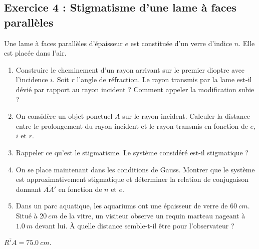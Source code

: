 \subsection{Exercice 4 : Stigmatisme d'une lame à faces parallèles}

Une lame à faces parallèles d'épaisseur $e$ est constituée d'un verre d'indice $n$. Elle est placée dans l'air. 

\begin{enumerate}
	\item Construire le cheminement d'un rayon arrivant sur le premier dioptre avec l'incidence $i$. Soit $r$ l'angle de réfraction. Le rayon transmis par la lame est-il dévié par rapport au rayon incident ? Comment appeler la modification subie ?
	\item On considère un objet ponctuel $A$ sur le rayon incident. Calculer la distance entre le prolongement du rayon incident et le rayon transmis en fonction de $e$, $i$ et $r$. 
	\item Rappeler ce qu'est le stigmatisme. Le système considéré est-il stigmatique ?
	\item On se place maintenant dans les conditions de Gauss. Montrer que le système est approximativement stigmatique et déterminer la relation de conjugaison donnant $\overline{AA'}$ en fonction de $n$ et $e$.
	\item Dans un parc aquatique, les aquariums ont une épaisseur de verre de $\SI{60}{cm}$. Situé à $\SI{20}{cm}$ de la vitre, un visiteur observe un requin marteau nageant à $\SI{1.0}{m}$ devant lui. À quelle distance semble-t-il être pour l'observateur ?
\end{enumerate}

 $\overline{R'A} = \SI{75.0}{cm}$.
